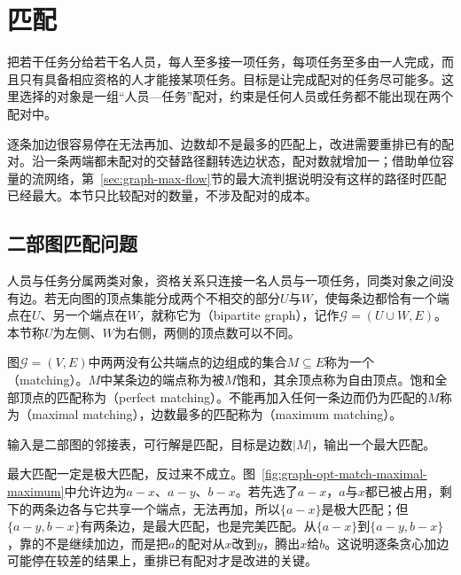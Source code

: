 
\section{匹配}
\label{sec:graph-matching}

把若干任务分给若干名人员，每人至多接一项任务，每项任务至多由一人完成，而且只有具备相应资格的人才能接某项任务。目标是让完成配对的任务尽可能多。这里选择的对象是一组“人员—任务”配对，约束是任何人员或任务都不能出现在两个配对中。

逐条加边很容易停在无法再加、边数却不是最多的匹配上，改进需要重排已有的配对。沿一条两端都未配对的交替路径翻转选边状态，配对数就增加一；借助单位容量的流网络，第~\ref{sec:graph-max-flow}节的最大流判据说明没有这样的路径时匹配已经最大。本节只比较配对的数量，不涉及配对的成本。

\subsection{二部图匹配问题}
\label{sec:graph-opt-match-problem}

人员与任务分属两类对象，资格关系只连接一名人员与一项任务，同类对象之间没有边。若无向图的顶点集能分成两个不相交的部分$U$与$W$，使每条边都恰有一个端点在$U$、另一个端点在$W$，就称它为（bipartite graph），记作$\mathcal G=(U\cup W,E)$。本节称$U$为左侧、$W$为右侧，两侧的顶点数可以不同。

\begin{definition}[匹配]
\label{def:graph-opt-matching}
图$\mathcal G=(V,E)$中两两没有公共端点的边组成的集合$M\subseteq E$称为一个（matching）。$M$中某条边的端点称为被$M$饱和，其余顶点称为自由顶点。饱和全部顶点的匹配称为（perfect matching）。不能再加入任何一条边而仍为匹配的$M$称为（maximal matching），边数最多的匹配称为（maximum matching）。
\end{definition}

输入是二部图的邻接表，可行解是匹配，目标是边数$|M|$，输出一个最大匹配。

最大匹配一定是极大匹配，反过来不成立。图~\ref{fig:graph-opt-match-maximal-maximum}中允许边为$a-x$、$a-y$、$b-x$。若先选了$a-x$，$a$与$x$都已被占用，剩下的两条边各与它共享一个端点，无法再加，所以$\{a-x\}$是极大匹配；但$\{a-y,b-x\}$有两条边，是最大匹配，也是完美匹配。从$\{a-x\}$到$\{a-y,b-x\}$，靠的不是继续加边，而是把$a$的配对从$x$改到$y$，腾出$x$给$b$。这说明逐条贪心加边可能停在较差的结果上，重排已有配对才是改进的关键。

